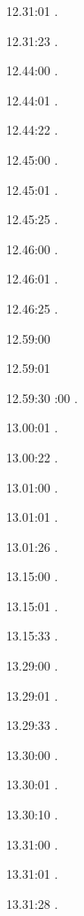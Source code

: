 \label{key}\documentclass[italian]{article}
\begin{document}
12.31:01    .

12.31:23    .

12.44:00    .

12.44:01    .

12.44:22    .

12.45:00    .

12.45:01    .

12.45:25    .

12.46:00    .

12.46:01    .

12.46:25    .

12.59:00    

12.59:01    

12.59:30    
:00    . 

13.00:01    . 

13.00:22    . 

13.01:00     . 

13.01:01     . 

13.01:26     . 

13.15:00     . 

13.15:01     .

13.15:33     .

13.29:00     . 

13.29:01     . 

13.29:33     . 

13.30:00     .

13.30:01     .

13.30:10     .

13.31:00     .

13.31:01     .

13.31:28     .
\end{document}

